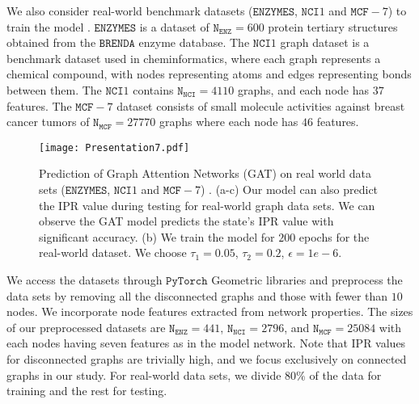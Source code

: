 \documentclass[aps, prd, showpacs, floatfix, superscriptaddress, twocolumn, nofootinbib, preprintnumbers, longbibliography]{revtex4-2}
\begin{document}
We also consider real-world benchmark datasets ($\texttt{ENZYMES}$, $\texttt{NCI}1$ and $\texttt{MCF}-7$) to train the model \cite{ivanov2019understanding, morris2020tudataset}. $\texttt{ENZYMES}$ is a dataset of $\texttt{N}_\texttt{ENZ} = 600$ protein tertiary structures obtained from the $\texttt{BRENDA}$ enzyme database. The $\texttt{NCI}1$ graph dataset is a benchmark dataset used in cheminformatics, where each graph represents a chemical compound, with nodes representing atoms and edges representing bonds between them. The $\texttt{NCI}1$ contains $\texttt{N}_{\texttt{NCI}} = 4110$ graphs, and each node has $37$ features. The $\texttt{MCF}-7$ dataset consists of small molecule activities against breast cancer tumors of $\texttt{N}_{\texttt{MCF}} = 27770$ graphs where each node has $46$ features.
\begin{figure*}[tbh]
\begin{center}
\texttt{[image: Presentation7.pdf]}
\caption{Prediction of Graph Attention Networks (GAT) on real world data sets ($\texttt{ENZYMES}$, $\texttt{NCI}1$ and $\texttt{MCF}-7$) \cite{ivanov2019understanding, morris2020tudataset}. (a-c) Our model can also predict the IPR value during testing for real-world graph data sets. We can observe the GAT model predicts the state's IPR value with significant accuracy. (b)  We train the model for $200$ epochs for the real-world dataset. We choose $\tau_{1} = 0.05$, $\tau_{2} = 0.2$, $\epsilon = 1e-6$.}
\label{loc_deloc_results_undirected_real}
\end{center}
\end{figure*}
We access the datasets through $\texttt{PyTorch}$ Geometric libraries and preprocess the data sets by removing all the disconnected graphs and those with fewer than $10$ nodes. We incorporate node features extracted from network properties. The sizes of our preprocessed datasets are $\texttt{N}_{\texttt{ENZ}} = 441$, $\texttt{N}_{\texttt{NCI}} = 2796$, and $\texttt{N}_{\texttt{MCF}} = 25084$ with each nodes having seven features as in the model network. Note that IPR values for disconnected graphs are trivially high, and we focus exclusively on connected graphs in our study. For real-world data sets, we divide $80\%$ of the data for training and the rest for testing.

\end{document}
